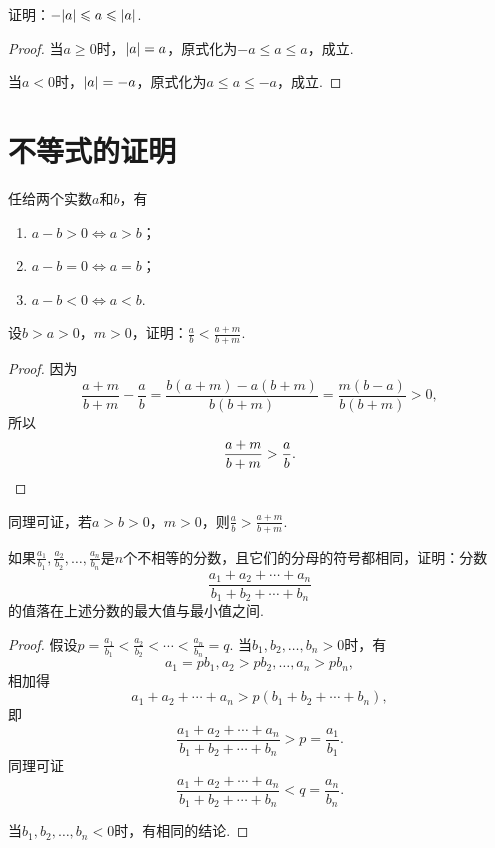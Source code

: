 \begin{example}
证明：\(-\abs{a} \leqslant a \leqslant \abs{a}\).
\begin{proof}
当\(a \geqslant 0\)时，\(\abs{a}=a\)，原式化为\(-a \leqslant a \leqslant a\)，成立.

当\(a < 0\)时，\(\abs{a}=-a\)，原式化为\(a \leqslant a \leqslant -a\)，成立.
\end{proof}
\end{example}

\section{不等式的证明}
\begin{theorem}[作差比较法]\label{theorem:不等式.作差比较法}
任给两个实数\(a\)和\(b\)，有\begin{enumerate}
\item \(a - b > 0 \iff a > b\)；
\item \(a - b = 0 \iff a = b\)；
\item \(a - b < 0 \iff a < b\).
\end{enumerate}
\end{theorem}

\begin{example}
设\(b > a > 0\)，\(m > 0\)，证明：\(\frac{a}{b} < \frac{a+m}{b+m}\).
\begin{proof}
因为\[
\frac{a+m}{b+m} - \frac{a}{b}
= \frac{b(a+m) - a(b+m)}{b(b+m)}
= \frac{m(b-a)}{b(b+m)} > 0,
\]所以\[
\frac{a+m}{b+m} > \frac{a}{b}.
\qedhere
\]
\end{proof}
\end{example}
同理可证，若\(a > b > 0\)，\(m > 0\)，则\(\frac{a}{b} > \frac{a+m}{b+m}\).

\begin{example}
如果\(\frac{a_1}{b_1},\frac{a_2}{b_2},\dotsc,\frac{a_n}{b_n}\)是\(n\)个不相等的分数，且它们的分母的符号都相同，证明：分数\[
\frac{a_1+a_2+\dotsb+a_n}{b_1+b_2+\dotsb+b_n}
\]的值落在上述分数的最大值与最小值之间.
\begin{proof}
假设\(p=\frac{a_1}{b_1}<\frac{a_2}{b_2}<\dotsb<\frac{a_n}{b_n}=q\).
当\(b_1,b_2,\dotsc,b_n>0\)时，有\[
a_1 = p b_1,
a_2 > p b_2,
\dotsc,
a_n > p b_n,
\]相加得\[
a_1 + a_2 + \dotsb + a_n > p(b_1 + b_2 + \dotsb + b_n),
\]即\[
\frac{a_1+a_2+\dotsb+a_n}{b_1+b_2+\dotsb+b_n} > p = \frac{a_1}{b_1}.
\]同理可证\[
\frac{a_1+a_2+\dotsb+a_n}{b_1+b_2+\dotsb+b_n} < q = \frac{a_n}{b_n}.
\]

当\(b_1,b_2,\dotsc,b_n<0\)时，有相同的结论.
\end{proof}
\end{example}

